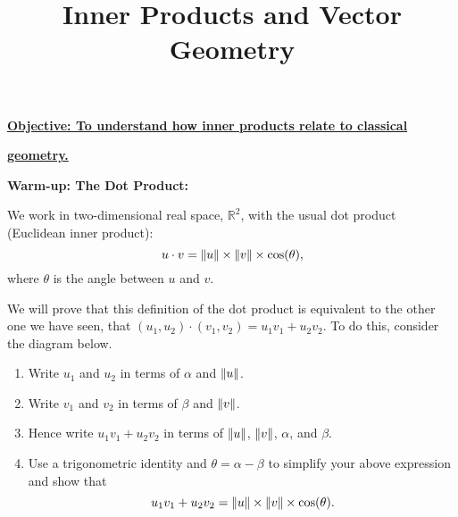 \documentclass{article}
\newcommand{\norm}[1]{\left|\kern-1pt\left|#1\right|\kern-1pt\right|}
\begin{document}
\title{Inner Products and Vector Geometry}
\date{}

\maketitle
\thispagestyle{empty}

\vskip -10mm

\Large

\textbf{\underline{Objective: To understand how inner products relate to classical}}

\textbf{\underline{geometry.}}





\vspace{3mm}







\textbf{Warm-up: The Dot Product:}\bigskip


We work in two-dimensional real space, $\mathbb{R}^2$, with the usual dot product (Euclidean inner product):
\[u\cdot v = \norm{u}\times \norm{v}\times \cos(\theta),\]
where $\theta$ is the angle between $u$ and $v$.

We will prove that this definition of the dot product is equivalent to the other one we have seen, that $(u_1,u_2)\cdot(v_1,v_2)=u_1v_1+u_2v_2$. To do this, consider the diagram below.
\begin{enumerate}
	\item Write $u_1$ and $u_2$ in terms of $\alpha$ and $\norm{u}$.
	\item Write $v_1$ and $v_2$ in terms of $\beta$ and $\norm{v}$.
	\item Hence write $u_1v_1+u_2v_2$ in terms of $\norm{u}$, $\norm{v}$, $\alpha$, and $\beta$.
	\item Use a trigonometric identity and $\theta=\alpha-\beta$ to simplify your above expression and show that
		\[u_1v_1+u_2v_2=\norm{u}\times \norm{v}\times \cos(\theta).\]
\end{enumerate}

\begin{center}
\end{center}
\end{document}
